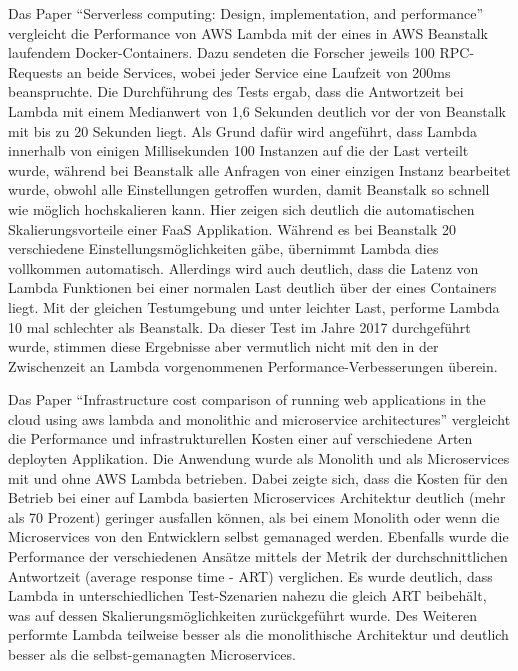 Das Paper "`Serverless computing: Design, implementation, and performance"'\cite{hendrickson_serverless_2017} vergleicht die Performance von AWS Lambda mit der eines in AWS Beanstalk laufendem Docker-Containers. Dazu sendeten die Forscher jeweils 100 RPC-Requests an beide Services, wobei jeder Service eine Laufzeit von 200ms beanspruchte. Die Durchführung des Tests ergab, dass die Antwortzeit bei Lambda mit einem Medianwert von 1,6 Sekunden deutlich vor der von Beanstalk mit bis zu 20 Sekunden liegt. Als Grund dafür wird angeführt, dass Lambda innerhalb von einigen Millisekunden 100 Instanzen auf die der Last verteilt wurde, während bei Beanstalk alle Anfragen von einer einzigen Instanz bearbeitet wurde, obwohl alle Einstellungen getroffen wurden, damit Beanstalk so schnell wie möglich hochskalieren kann. Hier zeigen sich deutlich die automatischen Skalierungsvorteile einer FaaS Applikation. Während es bei Beanstalk 20 verschiedene Einstellungsmöglichkeiten gäbe, übernimmt Lambda dies vollkommen automatisch.
Allerdings wird auch deutlich, dass die Latenz von Lambda Funktionen bei einer normalen Last deutlich über der eines Containers liegt. Mit der gleichen Testumgebung und unter leichter Last, performe Lambda 10 mal schlechter als Beanstalk. Da dieser Test im Jahre 2017 durchgeführt wurde, stimmen diese Ergebnisse aber vermutlich nicht mit den in der Zwischenzeit an Lambda vorgenommenen Performance-Verbesserungen überein.

Das Paper "`Infrastructure cost comparison of running web applications in the cloud using aws lambda and monolithic and microservice architectures"'\cite{villamizar_infrastructure_2016} vergleicht die Performance und infrastrukturellen Kosten einer auf verschiedene Arten deployten Applikation. Die Anwendung wurde als Monolith und als Microservices mit und ohne AWS Lambda betrieben. Dabei zeigte sich,  dass die Kosten für den Betrieb bei einer auf Lambda basierten Microservices Architektur deutlich (mehr als 70 Prozent) geringer ausfallen können, als bei einem Monolith oder wenn die Microservices von den Entwicklern selbst gemanaged werden. Ebenfalls wurde die Performance der verschiedenen Ansätze mittels der Metrik der durchschnittlichen Antwortzeit (average response time - ART) verglichen. Es wurde deutlich, dass Lambda in unterschiedlichen Test-Szenarien nahezu die gleich ART beibehält, was auf dessen Skalierungsmöglichkeiten zurückgeführt wurde. Des Weiteren performte Lambda teilweise besser als die monolithische Architektur und deutlich besser als die selbst-gemanagten Microservices.
